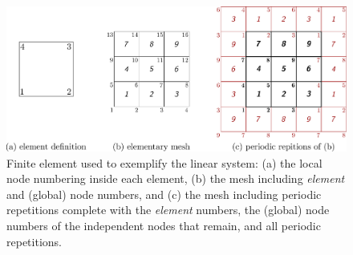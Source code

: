 \documentclass[times,namecite]{goose-article}
\begin{document}
\begin{figure}[htp]
  \centering
  \includegraphics[width=.8\textwidth]{mesh}
  \caption{Finite element used to exemplify the linear system: (a) the local node numbering inside each element, (b) the mesh including \textit{\textsf{element}} and (global) node numbers, and (c) the mesh including periodic repetitions complete with the \textit{\textsf{element}} numbers, the (global) node numbers of the independent nodes that remain, and all periodic repetitions.}
  \label{fig:mesh}
\end{figure}
\end{document}
